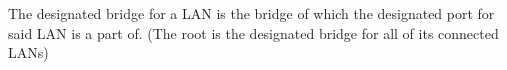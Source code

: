 The designated bridge for a LAN is the bridge of which the designated port for said LAN is a part of. (The root is the designated bridge for all of its connected LANs)